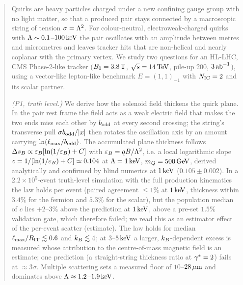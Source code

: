 \begin{abstract}
\noindent
Quirks are heavy particles charged under a new confining gauge group with no light matter, so that a produced pair stays
connected by a macroscopic string of tension $\sigma=\Lam^2$. For colour-neutral, electroweak-charged quirks with
$\Lam\sim0.1$--$100\keV$ the pair oscillates with an amplitude between metres and micrometres and leaves tracker hits that are
non-helical and nearly coplanar with the primary vertex. We study two questions for an HL-LHC, CMS Phase-2-like tracker
($B_0=3.8\tesla$, $\sqrt s=14\TeV$, pile-up 200, $3\abinv$), using a vector-like lepton-like benchmark $E=(1,1)_{-1}$
with $N_{\rm IC}=2$ and its scalar partner.

\emph{(P1, truth level.)} We derive how the solenoid field thickens the quirk plane. In the pair rest frame the field
acts as a weak electric field that makes the two ends miss each other by $\bodd$ at every second crossing; the string's
transverse pull $\sigma\bodd/|x|$ then rotates the oscillation axis by an amount carrying $\ln(\lmax/\bodd)$. The
accumulated plane thickness follows $\DsB\propto\epsB[\ln(1/\epsB)+C]$ with $\epsB=qB/\Lam^2$, i.e. a local
logarithmic slope $c=1/[\ln(1/\epsB)+C]\simeq0.104$ at $\Lam=1\keV$, $\mQ=500\GeV$, derived analytically and
confirmed by blind numerics at $1\keV$ ($0.105\pm0.002$). In a $2.2\times10^5$-event truth-level simulation with the
full production kinematics the law holds per event (paired agreement $\le1\%$ at $1\keV$, thickness within $3.4\%$ for
the fermion and $5.3\%$ for the scalar), but the population median of $c$ lies $+2$--$3\%$ above the prediction at
$1\keV$, above a pre-set $1.5\%$ validation gate, which therefore failed; we read this as an estimator effect of the
per-event scatter (estimate). The law holds for median $\lmax/\RIT\lesssim0.6$ and $\kB\lesssim4$; at $3$--$5\keV$ a
larger, $\kB$-dependent excess is measured whose attribution to the centre-of-mass magnetic field is an estimate; one
prediction (a straight-string thickness ratio at $\gst=2$) fails at $\approx3\sigma$. Multiple scattering
sets a measured floor of $10$--$28\um$ and dominates above $\Lam\approx1.2$--$1.9\keV$.


\end{abstract}
